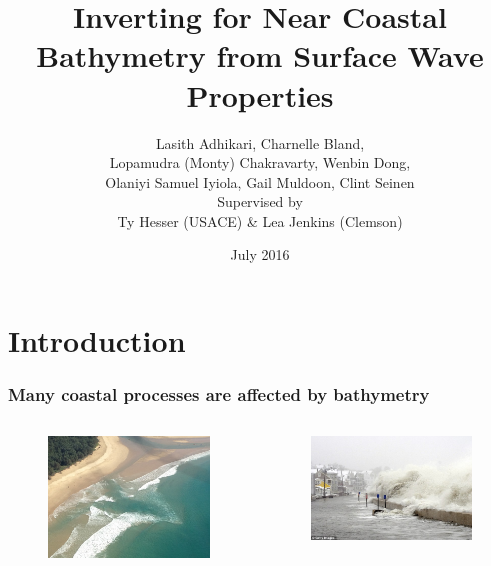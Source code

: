 \documentclass[7pt]{beamer}
\title[Bathymetry Inversion from Waves]{Inverting for Near Coastal Bathymetry from Surface Wave Properties}
\author[]{ 
Lasith Adhikari, Charnelle Bland, \\
Lopamudra (Monty) Chakravarty, Wenbin Dong, \\
Olaniyi Samuel Iyiola, Gail Muldoon, Clint Seinen \\
\vspace{5mm}
Supervised by\\ Ty  Hesser (USACE) \& Lea Jenkins (Clemson)
}
\institute[IMSM]{Industrial Mathematical and Statistical Modeling Workshop}
\date{July 2016}
\begin{document}
\frame{\titlepage}

\section{Introduction}

\begin{frame}
    \frametitle{Many coastal processes are affected by bathymetry}
        \begin{columns}
                \begin{figure}[h!]
                		\includegraphics[width=1\linewidth]{img/Rip_C.jpg}\hfill
                \end{figure}              
                \begin{figure}
                		\includegraphics[width=1\linewidth]{img/C_Flood.jpg}\vfill

\end{figure}
\end{columns}
\end{frame}
\end{document}
